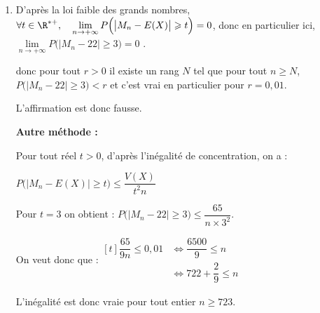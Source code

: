 \begin{enumerate}
\item 



D'après la loi faible des grands nombres, $\forall t \in \R^{*+}, \quad \lim\limits_{n \to +\infty} P\Big(\big|M_n - E(X)\big| \geqslant t\Big) = 0$, donc en particulier ici,  $\lim\limits_{n \to +\infty} P\Big(\big|M_n - 22\big| \geqslant 3\Big) = 0$ .


donc pour tout $r>0$ il existe un rang $N$ tel que pour tout $n \geqslant N$, $P\big(\left|M_{n}-22\right| \geqslant 3\big)< r$ et c'est vrai en particulier pour $r=0,01$.


L'affirmation est donc fausse.

\textbf{Autre méthode : }

Pour tout réel $t>0$, d'après l'inégalité de  concentration, on a :

$ P\big(\left|M_n-E(X)\right| \geqslant t\big) \leqslant \dfrac{V(X)}{t^2 n}$

	Pour $t=3$ on obtient :  $ P\big(|M_n-22| \geqslant 3\big)\leqslant \dfrac{65}{ n \times 3^2}$.



On veut donc que  :\quad $\begin{aligned}[t]
	 \dfrac{65}{9 n} \leqslant 0,01 &\iff
	 \dfrac{6500}{9} \leqslant n \\
	 &\iff 722+\dfrac{2}{9}\leqslant n
\end{aligned}$

L'inégalité est donc vraie pour tout entier $n \geqslant 723$.



\end{enumerate}



\bigskip
